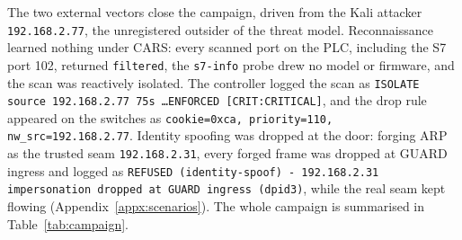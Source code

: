The two external vectors close the campaign, driven from the Kali attacker \texttt{192.168.2.77}, the unregistered outsider of the threat model. Reconnaissance learned nothing under CARS: every scanned port on the PLC, including the S7 port 102, returned \texttt{filtered}, the \texttt{s7-info} probe drew no model or firmware, and the scan was reactively isolated. The controller logged the scan as \texttt{ISOLATE source 192.168.2.77 75s \dots ENFORCED [CRIT:CRITICAL]}, and the drop rule appeared on the switches as \texttt{cookie=0xca, priority=110, nw\_src=192.168.2.77}. Identity spoofing was dropped at the door: forging ARP as the trusted seam \texttt{192.168.2.31}, every forged frame was dropped at GUARD ingress and logged as \texttt{REFUSED (identity-spoof) - 192.168.2.31 impersonation dropped at GUARD ingress (dpid3)}, while the real seam kept flowing (Appendix~\ref{appx:scenarios}). The whole campaign is summarised in Table~\ref{tab:campaign}.


